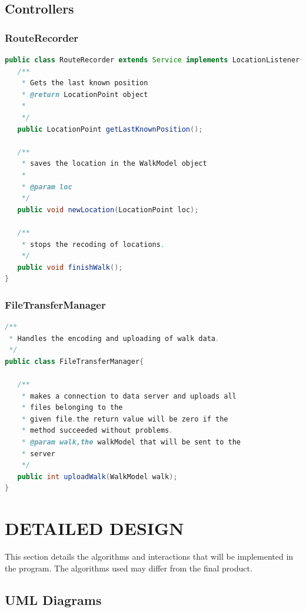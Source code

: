 \documentclass[12pt]{article}
\begin{document}
\subsection{Controllers}
\subsubsection{RouteRecorder}
\begin{lstlisting}[language=java]
public class RouteRecorder extends Service implements LocationListener{
   /**
   	* Gets the last known position
    * @return LocationPoint object
    * 
    */
   public LocationPoint getLastKnownPosition();

   /**
    * saves the location in the WalkModel object
    * 
    * @param loc
    */
   public void newLocation(LocationPoint loc);

   /**
    * stops the recoding of locations.
    */
   public void finishWalk();
}
\end{lstlisting}
\subsubsection{FileTransferManager}
\begin{lstlisting}[language=java]
/**
 * Handles the encoding and uploading of walk data.
 */
public class FileTransferManager{

   /**
    * makes a connection to data server and uploads all 
    * files belonging to the
    * given file.the return value will be zero if the 
    * method succeeded without problems.
    * @param walk,the walkModel that will be sent to the 
    * server
    */
   public int uploadWalk(WalkModel walk);
}
\end{lstlisting}
\section{DETAILED DESIGN}
This section details the algorithms and interactions that will be implemented in the program. The algorithms used may differ from the final product.
\subsection{UML Diagrams}
\end{document}
